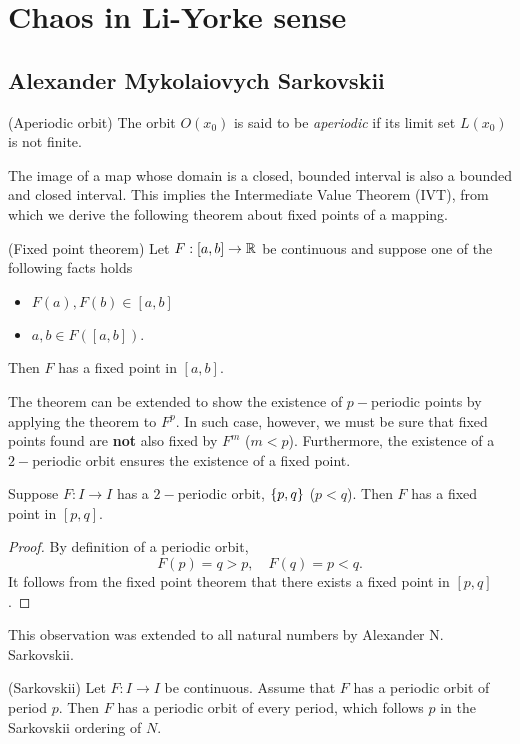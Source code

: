 \documentclass[11pt]{article}
\begin{document}
\section{Chaos in Li-Yorke sense}

\subsection{Alexander Mykolaiovych Sarkovskii}
\begin{definition}
  (Aperiodic orbit)
  The orbit $O(x_0)$ is said to be \textit{aperiodic} if its limit set $L(x_0)$ is not finite.
\end{definition}

The image of a map whose domain is a closed, bounded interval is also a bounded and closed interval.
This implies the Intermediate Value Theorem (IVT), from which we derive the following theorem about
fixed points of a mapping.
\begin{proposition}
  (Fixed point theorem)
  Let $F: [a,b] \to \mathbb{R}$ be continuous and suppose one of the following facts holds
  \begin{itemize}
    \item $F(a), F(b)\in [a,b]$
    \item $a, b\in F([a,b])$.
  \end{itemize}
  Then $F$ has a fixed point in $[a,b]$.
\end{proposition}

The theorem can be extended to show the existence of $p-$periodic points by applying the theorem to
$F^p$. In such case, however, we must be sure that fixed points found are \textbf{not} also fixed by
$F^m$ ($m < p$).
Furthermore, the existence of a $2-$periodic orbit ensures the existence of a fixed point.
\begin{proposition}
  Suppose $F: I\to I$ has a $2-$periodic orbit, $\{p,q\}$ ($p<q$). Then $F$ has a fixed point in $[p,q]$.
\end{proposition}
\begin{proof}
  By definition of a periodic orbit, 
  \begin{equation*}
    F(p) = q > p, \quad F(q) = p < q.
  \end{equation*}
  It follows from the fixed point theorem that there exists a fixed point in $[p,q]$.
\end{proof}

This observation was extended to all natural numbers by Alexander N. Sarkovskii.
\begin{proposition}
  (Sarkovskii)
  Let $F: I\to I$ be continuous. Assume that $F$ has a periodic orbit of period $p$.
  Then $F$ has a periodic orbit of every period, which follows $p$ in the Sarkovskii
  ordering of $N$.
\end{proposition}
\end{document}
